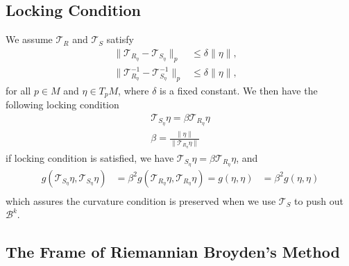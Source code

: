 \documentclass[12pt,a4paper,draft]{article}  %
\theoremstyle{definition}
\numberwithin{equation}{section}
\newcommand{\VT}{\mathcal{T}}
\begin{document}
\subsection{Locking Condition}
We assume $\VT_{R}$ and $\VT_{S}$ satisfy
\begin{align}
        \|\VT_{R_\eta}-\VT_{S_\eta}\|_p &\leq \delta \|\eta\|, \\
        \|\VT^{-1}_{R_\eta}-\VT^{-1}_{S_\eta}\|_p &\leq \delta \|\eta\|, \quad 
\end{align}
for all $p\in M$ and $\eta \in T_p M$, where $\delta$ is a fixed constant. We then have the following locking condition
\begin{equation}\label{locking_condition}
        \begin{aligned}
                \VT_{S_\eta}\eta = \beta\VT_{R_\eta}\eta\\
                \beta = \frac{\|\eta\|}{\|\VT_{R_\eta}\eta\|}
        \end{aligned}
\end{equation}
if locking condition is satisfied, we have $\VT_{S_\eta}\eta = \beta\VT_{R_\eta}\eta$, and
\begin{equation}
        \begin{aligned}
                g(\VT_{S_\eta}\eta, \VT_{S_\eta}\eta) &= \beta^2 g(\VT_{R_\eta}\eta, \VT_{R_\eta}\eta) = g(\eta, \eta)
                &= \beta^2 g(\eta, \eta)\\
        \end{aligned}
\end{equation}
which assures the curvature condition is preserved when we use $\VT_S$ to push out $\mathcal{B}^k$.
\subsection{The Frame of Riemannian Broyden's Method}
\end{document}
